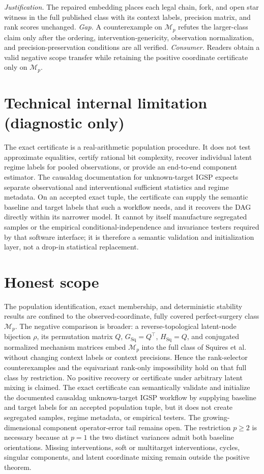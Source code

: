 \documentclass{article}
\begin{document}
\par\smallskip\noindent \textit{Justification.} The repaired embedding places each legal chain, fork, and open star witness in the full published class with its context labels, precision matrix, and rank scores unchanged. \textit{Gap.} A counterexample on \(\mathcal M_p\) refutes the larger-class claim only after the ordering, intervention-genericity, observation normalization, and precision-preservation conditions are all verified. \textit{Consumer.} Readers obtain a valid negative scope transfer while retaining the positive coordinate certificate only on \(\mathcal M_p\).

\section*{Technical internal limitation (diagnostic only)}

The exact certificate is a real-arithmetic population procedure. It does not test approximate equalities, certify rational bit complexity, recover individual latent regime labels for pooled observations, or provide an end-to-end component estimator. The causaldag documentation for unknown-target IGSP expects separate observational and interventional sufficient statistics and regime metadata. On an accepted exact tuple, the certificate can supply the semantic baseline and target labels that such a workflow needs, and it recovers the DAG directly within its narrower model. It cannot by itself manufacture segregated samples or the empirical conditional-independence and invariance testers required by that software interface; it is therefore a semantic validation and initialization layer, not a drop-in statistical replacement.

\section{Honest scope}

The population identification, exact membership, and deterministic stability results are confined to the observed-coordinate, fully covered perfect-surgery class \(\mathcal M_p\). The negative comparison is broader: a reverse-topological latent-node bijection \(\rho\), its permutation matrix \(Q\), \(G_{\mathrm{Sq}}=Q^{\top}\), \(H_{\mathrm{Sq}}=Q\), and conjugated normalized mechanism matrices embed \(\mathcal M_p\) into the full class of Squires et al. without changing context labels or context precisions. Hence the rank-selector counterexamples and the equivariant rank-only impossibility hold on that full class by restriction. No positive recovery or certificate under arbitrary latent mixing is claimed. The exact certificate can semantically validate and initialize the documented causaldag unknown-target IGSP workflow by supplying baseline and target labels for an accepted population tuple, but it does not create segregated samples, regime metadata, or empirical testers. The growing-dimensional component operator-error tail remains open. The restriction \(p\ge2\) is necessary because at \(p=1\) the two distinct variances admit both baseline orientations. Missing interventions, soft or multitarget interventions, cycles, singular components, and latent coordinate mixing remain outside the positive theorem.
\end{document}
